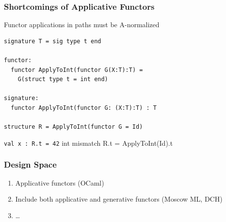 \documentclass{beamer}
\begin{document}
\begin{frame}[fragile]
\frametitle{Shortcomings of Applicative Functors}
\begin{block}{Functor applications in paths must be A-normalized}
\begin{lstlisting}
signature T = sig type t end

functor:
  functor ApplyToInt(functor G(X:T):T) = 
    G(struct type t = int end)

signature: 
  functor ApplyToInt(functor G: (X:T):T) : T

structure R = ApplyToInt(functor G = Id)
\end{lstlisting}

\lstinline{val x : R.t = 42} \alert{int mismatch R.t = ApplyToInt(Id).t}
\end{block}	
\end{frame}

\begin{frame}
\frametitle{Design Space}
\begin{enumerate}
	\itemsep=1cm
	\item Applicative functors (OCaml)
	\item Include both applicative and generative functors (Moscow ML, DCH)
	\item \ldots
\end{enumerate}	
\end{frame}
\end{document}
